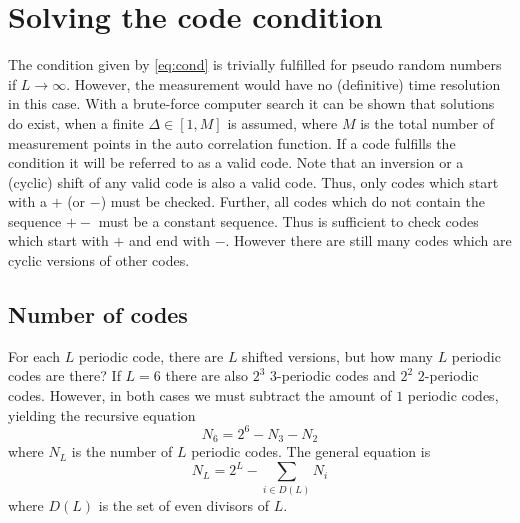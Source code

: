 \documentclass[18pt,a4paper]{extarticle}
\begin{document}
\section{Solving the code condition}
The condition given by \eqref{eq:cond} is trivially fulfilled for pseudo random numbers if $L \rightarrow \infty$.
However, the measurement would have no (definitive) time resolution in this case.
With a brute-force computer search it can be shown that solutions do exist, when a finite $\Delta \in [1, M]$ is assumed, where $M$ is the total number of measurement points in the auto correlation function.
If a code fulfills the condition it will be referred to as a valid code.
Note that an inversion or a (cyclic) shift of any valid code is also a valid code.
Thus, only codes which start with a $+$ (or $-$) must be checked.
Further, all codes which do not contain the sequence $+-$ must be a constant sequence.
Thus is sufficient to check codes which start with $+$ and end with $-$.
However there are still many codes which are cyclic versions of other codes.

\subsection{Number of codes}
For each $L$ periodic code, there are $L$ shifted versions, but how many $L$ periodic codes are there?
If $L=6$ there are also $2^3$ $3$-periodic codes and $2^2$ $2$-periodic codes.
However, in both cases we must subtract the amount of $1$ periodic codes, yielding the recursive equation
\begin{equation}
N_6 = 2^6 - N_3 - N_2
\end{equation}
where $N_L$ is the number of $L$ periodic codes.
The general equation is
\begin{equation}
N_L = 2^L - \sum_{i \in D(L)} N_i
\end{equation}
where $D(L)$ is the set of even divisors of $L$.
\end{document}
